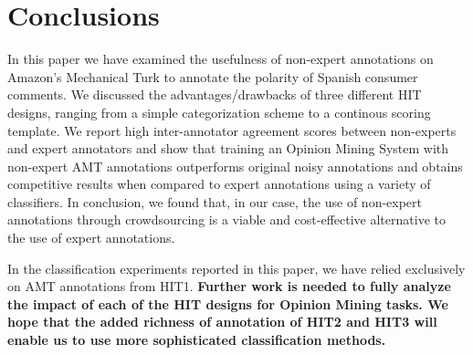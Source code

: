 \documentclass[11pt, a4paper,onecolumn]{article}
\begin{document}
\section{Conclusions}
\label{sect:conclusions}


In this paper we have examined the usefulness of non-expert annotations on Amazon's Mechanical Turk to annotate the polarity of Spanish consumer comments. We discussed the advantages/drawbacks of three different HIT designs, ranging from a simple categorization scheme to a continous scoring template. We report high inter-annotator agreement scores between non-experts and expert annotators and show that training an Opinion Mining System with non-expert AMT annotations outperforms original noisy annotations and obtains competitive results when compared to expert annotations using a variety of classifiers. In conclusion, we found that, in our case, the use of non-expert annotations through crowdsourcing is a viable and cost-effective alternative to the use of expert annotations.

In the classification experiments reported in this paper, we have relied exclusively on AMT annotations from HIT1. \textbf{Further work is needed to fully analyze the impact of each of the HIT designs for Opinion Mining tasks. We hope that the added richness of annotation of HIT2 and HIT3 will enable us to use more sophisticated classification methods.}



\end{document}
